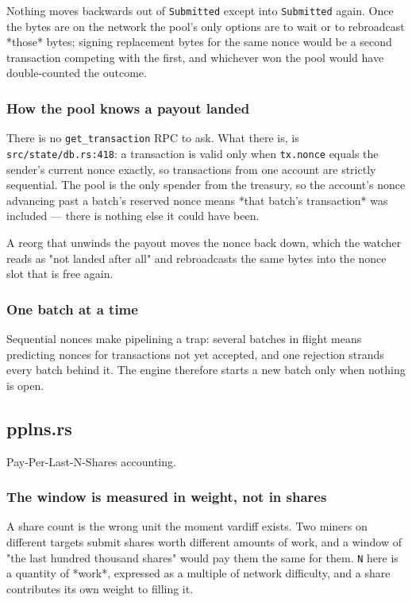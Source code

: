 \documentclass[11pt,a4paper]{article}
\begin{document}
Nothing moves backwards out of \texttt{Submitted} except into \texttt{Submitted} again.
Once the bytes are on the network the pool's only options are to wait or to
rebroadcast *those* bytes; signing replacement bytes for the same nonce
would be a second transaction competing with the first, and whichever won
the pool would have double-counted the outcome.

\subsubsection{How the pool knows a payout landed}

There is no \texttt{get\_transaction} RPC to ask. What there is, is
\texttt{src/state/db.rs:418}: a transaction is valid only when \texttt{tx.nonce} equals
the sender's current nonce exactly, so transactions from one account are
strictly sequential. The pool is the only spender from the treasury, so the
account's nonce advancing past a batch's reserved nonce means *that batch's
transaction* was included — there is nothing else it could have been.

A reorg that unwinds the payout moves the nonce back down, which the watcher
reads as "not landed after all" and rebroadcasts the same bytes into the
nonce slot that is free again.

\subsubsection{One batch at a time}

Sequential nonces make pipelining a trap: several batches in flight means
predicting nonces for transactions not yet accepted, and one rejection
strands every batch behind it. The engine therefore starts a new batch only
when nothing is open.

\subsection{pplns.rs}
Pay-Per-Last-N-Shares accounting.

\subsubsection{The window is measured in weight, not in shares}

A share count is the wrong unit the moment vardiff exists. Two miners on
different targets submit shares worth different amounts of work, and a
window of "the last hundred thousand shares" would pay them the same for
them. \texttt{N} here is a quantity of *work*, expressed as a multiple of network
difficulty, and a share contributes its own weight to filling it.
\end{document}
